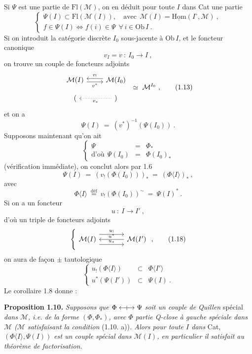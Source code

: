 \documentclass[11pt]{article}
\newcommand{\printedpage}[1]{\marginpar{\footnotesize p.~#1}}
\newcommand{\msp}[1]{\marginpar{\footnotesize [#1]}}
\newcommand{\Qcouple}{\mathrel{\leftarrow\mkern-9mu{+}\mkern-9mu\rightarrow}}
\newcommand{\fl}{\longrightarrow}
\begin{document}
\msp{page 10}
Si $\Psi$ est une partie de $\mathrm{Fl}(\mathcal{M})$, on en déduit pour toute $I$ dans Cat une partie
\[
\left\{
\begin{array}{l}
\Psi(I) \subset \mathrm{Fl}(\mathcal{M}(I)), \quad \text{avec}\ \ \mathcal{M}(I) = \underline{\mathrm{Hom}}(I^{\circ}, \mathcal{M})\ , \\[1ex]
f \in \Psi(I) \iff f(i) \in \Psi \ \ \forall\, i \in \mathrm{Ob}\, I\ .
\end{array}
\right.
\tag*{(1.11)}
\]
Si on introduit la catégorie discrète $I_0$ sous-jacente à $\mathrm{Ob}\, I$, et le foncteur canonique
\[
v_I = v \ :\ I_0 \fl I\ , \tag*{(1.12)}
\]
on trouve un couple de foncteurs adjoints
\[
\begin{tikzcd}[row sep=small]
\mathcal{M}(I) \arrow[r, shift right=1, "v^{*}"'] & \mathcal{M}(I_0) \arrow[l, shift right=1, "v_{!}"'] \\
( & ) \arrow[l, dotted, "v_{*}"]
\end{tikzcd}
\ \simeq\ \mathcal{M}^{I_0}\ ,
\tag*{(1.13)}
\]
et on a
\[
\Psi(I) \ =\ (v^{*})^{-1}(\Psi(I_0))\ .
\]
Supposons maintenant qu'on ait
\[
\left\{
\begin{array}{rcl}
\Psi & = & \Phi_{*} \\[1ex]
\text{d'où}\ \ \Psi(I_0) & = & \Phi(I_0)_{*}
\end{array}
\right.
\tag*{(1.14)}
\]
(vérification immédiate), on conclut alors par 1.6
\[
\Psi(I) \ =\ (v_{!}(\Phi(I_0)))_{*} \ =\ (\Phi\langle I\rangle)_{*}\ , \tag*{(1.15)}
\]
avec
\[
\Phi\langle I\rangle \ \overset{\text{déf}}{=}\ v_{!}(\Phi(I_0))^{\sim} \ =\ \Psi(I)^{*}\ . \tag*{(1.16)}
\]
Si on a un foncteur
\[
u \ :\ I \fl I'\ , \tag*{(1.17)}
\]
d'où un triple de foncteurs adjoints
\printedpage{7}
\msp{page 11}
\[
\left\{
\begin{tikzcd}[column sep=large]
\mathcal{M}(I) \arrow[r, shift left=3, "u_{!}"] \arrow[r, shift right=3, "u_{*}"] & \mathcal{M}(I') \arrow[l, "u^{*}"']
\end{tikzcd}
\right.
,
\tag*{(1.18)}
\]
on aura de façon $\pm$ tautologique
\[
\left\{
\begin{array}{rcl}
u_{!}(\Phi\langle I\rangle) & \subset & \Phi\langle I'\rangle \\
u^{*}(\Psi(I')) & \subset & \Psi(I)\ .
\end{array}
\right.
\tag*{(1.19)}
\]
Le corollaire 1.8 donne :

\textbf{Proposition 1.10.} \textit{Supposons que $\Phi \Qcouple \Psi$ soit un couple de Quillen} spécial \textit{dans $\mathcal{M}$, i.e. de la forme $(\Phi, \Phi_{*})$, avec $\Phi$ partie Q-close à gauche spéciale dans $\mathcal{M}$ ($\mathcal{M}$ satisfaisant la condition} (1.10. a))\textit{. Alors pour toute $I$ dans} Cat, \textit{$(\Phi\langle I\rangle, \Psi(I))$ est un couple spécial dans $\mathcal{M}(I)$, en particulier il satisfait au théorème de factorisation.}
\end{document}
